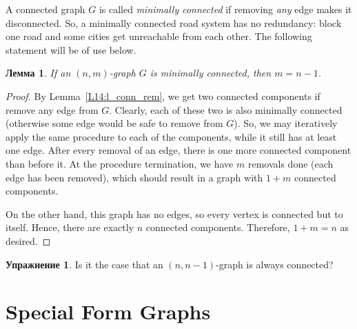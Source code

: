 \documentclass[12pt,notitlepage]{article}
\theoremstyle{plain}
\newtheorem{lemma}[thm]{Лемма}
\theoremstyle{definition}
\newtheorem{exc}[thm]{Упражнение}
\theoremstyle{plain}
\newcommand{\1}{\mathbf{1}}
\newcommand{\0}{\mathbf{0}}
\begin{document}
A connected graph $G$ is called \emph{minimally connected} if removing \emph{any} edge makes it disconnected. So, a minimally connected road system has no redundancy: block one road and some cities get unreachable from each other. The following statement will be of use below.

\begin{lemma}\label{L14:l_min_conn_edge}
	If an $(n,m)$-graph $G$ is minimally connected, then $m = n - 1$.
\end{lemma}
\begin{proof}
	By Lemma~\ref{L14:l_conn_rem}, we get two connected components if remove any edge from $G$. Clearly, each of these two is also minimally connected (otherwise some edge would be safe to remove from $G$). So, we may iteratively apply the same procedure to each of the components, while it still has at least one edge. After every removal of an edge, there is one more connected component than before it. At the procedure termination, we have $m$ removals done (each edge has been removed), which should result in a graph with $1 + m$ connected components.
	
	On the other hand, this graph has no edges, so every vertex is connected but to itself. Hence, there are exactly $n$ connected components. Therefore, $1 + m = n$ as desired.
\end{proof}

\begin{exc}
	Is it the case that an $(n, n - 1)$-graph is always connected?
\end{exc}

\section{Special Form Graphs}
\end{document}
